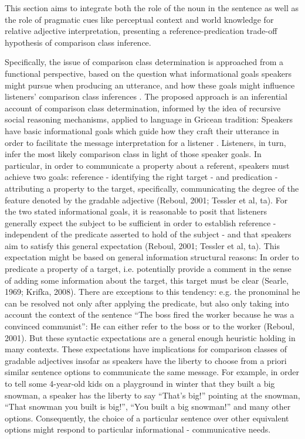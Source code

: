 This section aims to integrate both the role of the noun in the sentence as well as the role of pragmatic cues like perceptual context and world knowledge for relative adjective interpretation, presenting a reference-predication trade-off hypothesis of comparison class inference. 

Specifically, the issue of comparison class determination is approached from a functional perspective, based on the question what informational goals speakers might pursue when producing an utterance, and how these goals might influence listeners’ comparison class inferences \parencite{tessler2020}.
The proposed approach is an inferential account of comparison class determination, informed by the idea of recursive social reasoning mechanisms, applied to language in Gricean tradition: Speakers have basic informational goals which guide how they craft their utterance in order to facilitate the message interpretation for a listener \parencite{goodman2016}. Listeners, in turn, infer the most likely comparison class in light of those speaker goals. In particular, in order to communicate a property about a referent, speakers must achieve two goals: reference - identifying the right target - and predication - attributing a property to the target, specifically, communicating  the degree of the feature denoted by the gradable adjective (Reboul, 2001; Tessler et al, ta).  
For the two stated informational goals, it is reasonable to posit that listeners generally expect the subject to be sufficient in order to establish reference - independent of the predicate asserted to hold of the subject - and that speakers aim to satisfy this general expectation (Reboul, 2001; Tessler et al, ta). This expectation might be based on general information structural reasons: In order to predicate a property of a target, i.e. potentially provide a comment in the sense of adding some information about the target, this target must be clear (Searle, 1969; Krifka, 2008). There are exceptions to this tendency: e.g. the pronominal he can be resolved not only after applying the predicate, but also only taking into account the context of the sentence “The boss fired the worker because he was a convinced communist”: He can either refer to the boss or to the worker (Reboul, 2001). But these syntactic expectations are a general enough heuristic holding in many contexts.
These expectations have implications for comparison classes of gradable adjectives insofar as speakers have the liberty to choose from a priori similar sentence options to communicate the same message. For example, in order to tell some 4-year-old kids on a playground in winter that they built a big snowman, a speaker has the liberty to say “That’s big!” pointing at the snowman, “That snowman you built is big!”, “You built a big snowman!” and many other options. Consequently, the choice of a particular sentence over other equivalent options might respond to particular informational - communicative needs. 

